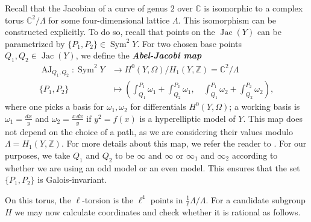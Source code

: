 \documentclass{amsproc}
\numberwithin{equation}{section}
\theoremstyle{definition}
\theoremstyle{remark}
\newcommand{\vocab}[1]{\textbf{\textit{\boldmath #1}}}
\DeclareMathOperator{\Jac}{Jac}
\DeclareMathOperator{\Sym}{Sym}
\newcommand{\ZZ}{\mathbb Z}
\newcommand{\CC}{\mathbb C}
\begin{document}
Recall that the Jacobian of a curve of genus $2$ over $\CC$ is isomorphic to a complex torus $\mathbb{C}^2/\Lambda$ for some four-dimensional lattice $\Lambda$.
This isomorphism can be constructed explicitly. 
To do so, recall that points on the $\Jac(Y)$ can be parametrized by $\{P_1,P_2\}\in \Sym^2 Y$.
For two chosen base points $Q_1,Q_2\in\Jac(Y)$, we define the \vocab{Abel-Jacobi map}
\begin{equation}
\begin{aligned}
\operatorname{AJ}_{Q_1,Q_2} : \Sym^2 Y &\to  H^0(Y, \Omega) / H_1(Y, \ZZ) = \CC^2 / \Lambda\\
\{P_1, P_2\} &\mapsto \left(\int_{Q_1}^{P_1} \omega_1 + \int_{Q_2}^{P_2} \omega_1,\quad \int_{Q_1}^{P_1} \omega_2 + \int_{Q_2}^{P_2} \omega_2\right),
\end{aligned}
\end{equation}
where one picks a basis for $\omega_1, \omega_2$ for differentials $H^0(Y, \Omega)$; a working basis is $\omega_1 = \tfrac{dx}y$ and $\omega_2 = \tfrac{x\,dx}y$ if $y^2=f(x)$ is a hyperelliptic model of $Y$.
This map does not depend on the choice of a path, as we are considering their values modulo $\Lambda = H_1(Y, \ZZ)$. For more details about this map, we refer the reader to \cite[\S 1.18]{milne_av}. For our purposes, we take $Q_1$ and $Q_2$ to be $\infty$ and $\infty$ or $\infty_1$ and $\infty_2$ according to whether we are using an odd model or an even model. This ensures that the set $\{P_1, P_2\}$ is Galois-invariant.

On this torus, the $\ell$-torsion is the $\ell^4$ points in $\frac{1}{\ell}\Lambda/\Lambda$. For a candidate subgroup $H$ we may now calculate coordinates and check whether it is rational as follows.
\end{document}
